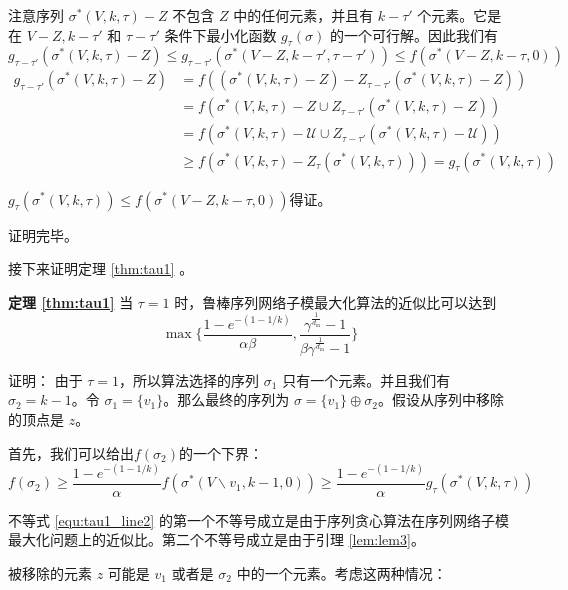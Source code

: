 注意序列 $\sigma^*(V,k,\tau) - Z$ 不包含 $Z$ 中的任何元素，并且有 $k-\tau'$ 个元素。它是在 $V-Z,k-\tau'$ 和 $\tau-\tau'$ 条件下最小化函数 $g_\tau(\sigma)$ 的一个可行解。因此我们有
\begin{equation}
g_{\tau-\tau'}(\sigma^*(V,k,\tau) - Z)  \le g_{\tau-\tau'}(\sigma^*(V-Z,k-\tau',\tau-\tau')) \le f(\sigma^*(V-Z,k-\tau,0))
\end{equation}
\begin{align}
    g_{\tau-\tau'}(\sigma^*(V,k,\tau) - Z) & = f((\sigma^*(V,k,\tau) - Z) - Z_{\tau-\tau'}(\sigma^*(V,k,\tau) - Z)) \\
    & = f(\sigma^*(V,k,\tau) - Z \cup Z_{\tau-\tau'}(\sigma^*(V,k,\tau) - Z)) \\
    & = f(\sigma^*(V,k,\tau) - \mathcal{U} \cup Z_{\tau-\tau'}(\sigma^*(V,k,\tau) - \mathcal{U})) \\
    & \ge f(\sigma^*(V,k,\tau) - Z_{\tau}(\sigma^*(V,k,\tau))) = g_{\tau}(\sigma^*(V,k,\tau))
\end{align}

$g_{\tau}(\sigma^*(V,k,\tau)) \le f(\sigma^*(V-Z,k-\tau,0))$得证。

\noindent 证明完毕。

接下来证明定理 \ref{thm:tau1} 。

\noindent \textbf{定理 \ref{thm:tau1}} 当 $\tau=1$ 时，鲁棒序列网络子模最大化算法的近似比可以达到
\begin{equation*}
\max\{\frac{1-e^{-(1-1/k)}}{\alpha\beta},\frac{\gamma^{\frac{1}{d_{\text{in}}}}-1}{\beta \gamma^{\frac{1}{d_{\text{in}}}}-1}\}\end{equation*}

\noindent 证明：
由于 $\tau=1$，所以算法选择的序列 $\sigma_1$ 只有一个元素。并且我们有 $\sigma_2=k-1$。令 $\sigma_1=\{v_1\}$。那么最终的序列为 $\sigma= \{v_1\} \oplus \sigma_2$。假设从序列中移除的顶点是 $z$。

首先，我们可以给出$f(\sigma_2)$的一个下界：
\begin{equation}
    f(\sigma_2)  \ge \frac{1-e^{-(1-1/k)}}{\alpha} f(\sigma^*(V\backslash v_1,k-1,0))
     \ge \frac{1-e^{-(1-1/k)}}{\alpha} g_\tau(\sigma^*(V,k,\tau)) \label{equ:tau1_line2}
\end{equation}

不等式 \ref{equ:tau1_line2} 的第一个不等号成立是由于序列贪心算法在序列网络子模最大化问题上的近似比\cite{mitrovic2018submodularity}。第二个不等号成立是由于引理 \ref{lem:lem3}。

被移除的元素 $z$ 可能是 $v_1$ 或者是 $\sigma_2$ 中的一个元素。考虑这两种情况：

